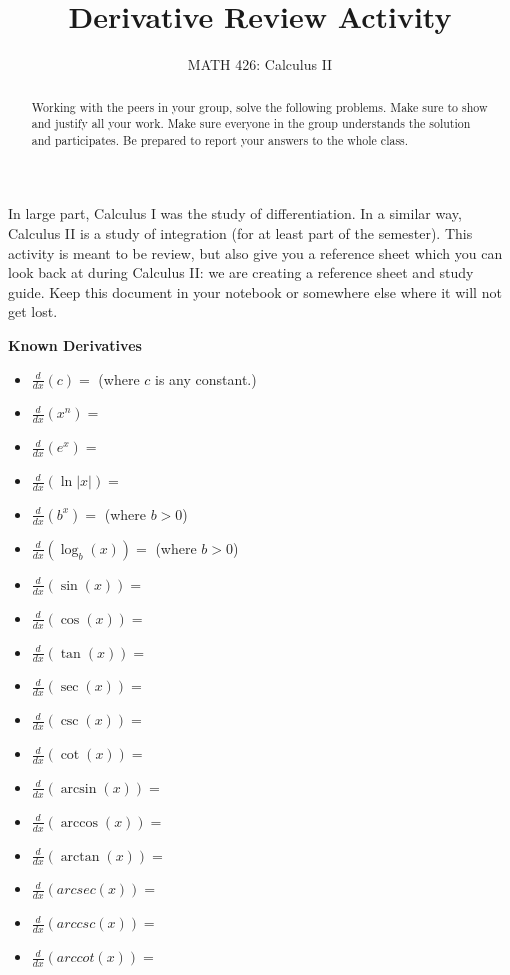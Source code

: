 \documentclass{ximera}
\title{Derivative Review Activity}
\author{MATH 426: Calculus II}
\begin{document}
\begin{abstract}
   Working with the peers in your group, solve the following problems. Make sure to show and justify all your work. Make sure everyone in the group understands the solution and participates. Be prepared to report your answers to the whole class. 
\end{abstract}
\maketitle

In large part, Calculus I was the study of differentiation.  In a similar way, Calculus II is a study of integration (for at least part of the semester).  This activity is meant to be review, but also give you a reference sheet which you can look back at during Calculus II: we are creating a reference sheet and study guide.  Keep this document in your notebook or somewhere else where it will not get lost.

\begin{exercise}
   \textbf{Known Derivatives}
   \begin{itemize}
    \item $\frac{d}{dx}(c)=$ (where $c$ is any constant.)
    \item $\frac{d}{dx}(x^n)=$
    \item $\frac{d}{dx}(e^x)=$
    \item $\frac{d}{dx}(\ln|x|)=$
    \item $\frac{d}{dx}(b^x)=$ (where $b>0$)
    \item $\frac{d}{dx}(\log_b(x))=$ (where $b>0$)
    \item $\frac{d}{dx}(\sin(x))=$
    \item $\frac{d}{dx}(\cos(x))=$
    \item $\frac{d}{dx}(\tan(x))=$
    \item $\frac{d}{dx}(\sec(x))=$
    \item $\frac{d}{dx}(\csc(x))=$
    \item $\frac{d}{dx}(\cot(x))=$
    \item $\frac{d}{dx}(\arcsin(x))=$
    \item $\frac{d}{dx}(\arccos(x))=$
    \item $\frac{d}{dx}(\arctan(x))=$
    \item $\frac{d}{dx}(arcsec(x))=$
    \item $\frac{d}{dx}(arccsc(x))=$
    \item $\frac{d}{dx}(arccot(x))=$
   \end{itemize}
\end{exercise}
\end{document}
